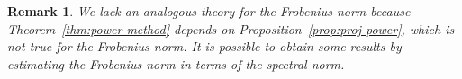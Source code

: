 \documentclass[final]{siamltex}
\newcounter{algorithm}[section]
\newcommand{\pgnotate}[1]{{\color{blue}[#1]}}
\newcommand{\notate}[1]{\textcolor{red}{\textbf{[#1]}}}
\newtheorem{remark}{Remark}[section]
\begin{document}

\lsp

\begin{remark} \rm
We lack an analogous theory for the Frobenius norm because
Theorem~\ref{thm:power-method} depends on Proposition~\ref{prop:proj-power},
which is not true for the Frobenius norm.  It is possible to obtain some results
by estimating the Frobenius norm in terms of the spectral norm.
\end{remark}

\lsp

%
%
%
%
%
%
\end{document}
